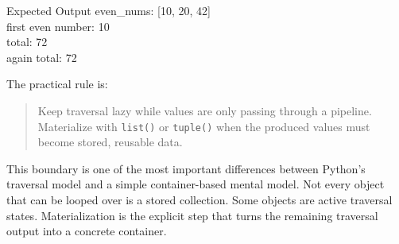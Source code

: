 \begin{iobox}{Expected Output}
even\_nums: [10, 20, 42] \\
first even number: 10 \\
total: 72 \\
again total: 72 \\
\end{iobox}




The practical rule is:

\begin{quote}
Keep traversal lazy while values are only passing through a pipeline. Materialize with \texttt{list()} or \texttt{tuple()} when the produced values must become stored, reusable data.
\end{quote}

This boundary is one of the most important differences between Python's traversal model and a simple container-based mental model. Not every object that can be looped over is a stored collection. Some objects are active traversal states. Materialization is the explicit step that turns the remaining traversal output into a concrete container.
